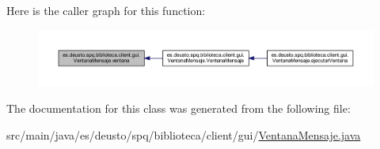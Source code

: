 Here is the caller graph for this function\+:
\nopagebreak
\begin{figure}[H]
\begin{center}
\leavevmode
\includegraphics[width=350pt]{classes_1_1deusto_1_1spq_1_1biblioteca_1_1client_1_1gui_1_1_ventana_mensaje_a6e1e53edc811caa880731fd36f304bd2_icgraph}
\end{center}
\end{figure}


The documentation for this class was generated from the following file\+:\begin{DoxyCompactItemize}
\item 
src/main/java/es/deusto/spq/biblioteca/client/gui/\mbox{\hyperlink{_ventana_mensaje_8java}{Ventana\+Mensaje.\+java}}\end{DoxyCompactItemize}

